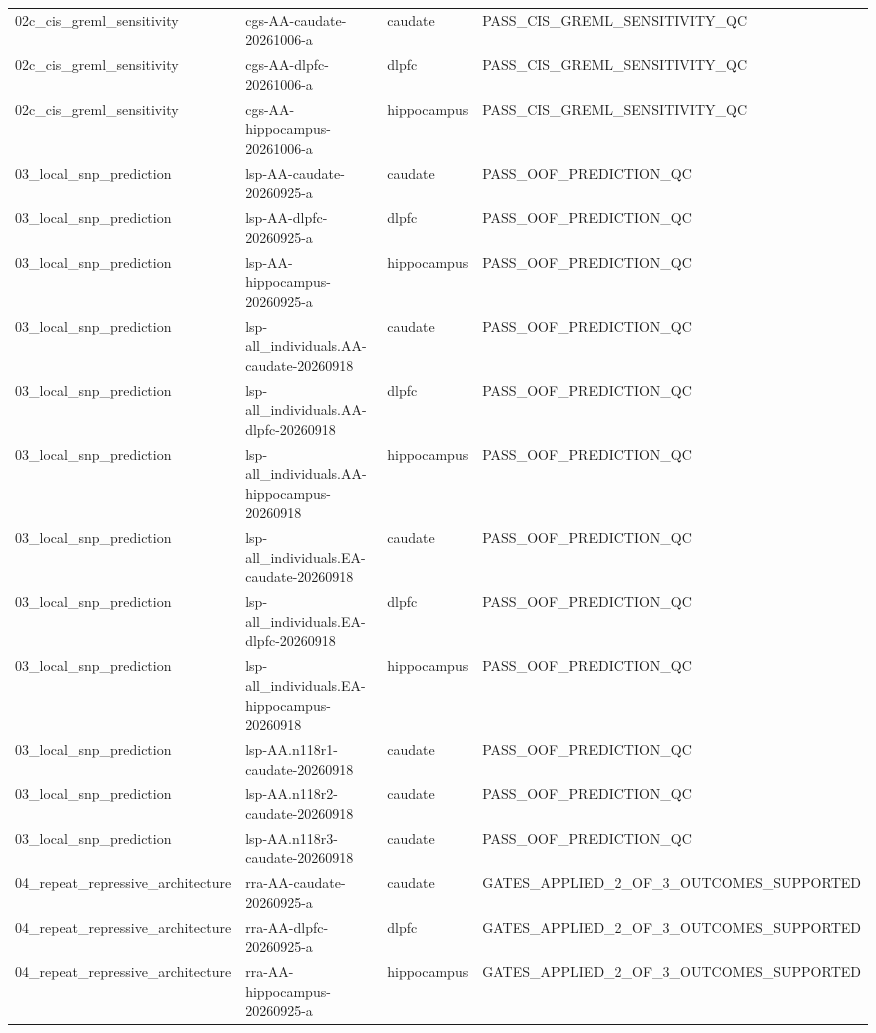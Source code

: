 \begin{tabular}{llll}
02c\_cis\_greml\_sensitivity & cgs-AA-caudate-20261006-a & caudate & PASS\_CIS\_GREML\_SENSITIVITY\_QC \\
02c\_cis\_greml\_sensitivity & cgs-AA-dlpfc-20261006-a & dlpfc & PASS\_CIS\_GREML\_SENSITIVITY\_QC \\
02c\_cis\_greml\_sensitivity & cgs-AA-hippocampus-20261006-a & hippocampus & PASS\_CIS\_GREML\_SENSITIVITY\_QC \\
03\_local\_snp\_prediction & lsp-AA-caudate-20260925-a & caudate & PASS\_OOF\_PREDICTION\_QC \\
03\_local\_snp\_prediction & lsp-AA-dlpfc-20260925-a & dlpfc & PASS\_OOF\_PREDICTION\_QC \\
03\_local\_snp\_prediction & lsp-AA-hippocampus-20260925-a & hippocampus & PASS\_OOF\_PREDICTION\_QC \\
03\_local\_snp\_prediction & lsp-all\_individuals.AA-caudate-20260918 & caudate & PASS\_OOF\_PREDICTION\_QC \\
03\_local\_snp\_prediction & lsp-all\_individuals.AA-dlpfc-20260918 & dlpfc & PASS\_OOF\_PREDICTION\_QC \\
03\_local\_snp\_prediction & lsp-all\_individuals.AA-hippocampus-20260918 & hippocampus & PASS\_OOF\_PREDICTION\_QC \\
03\_local\_snp\_prediction & lsp-all\_individuals.EA-caudate-20260918 & caudate & PASS\_OOF\_PREDICTION\_QC \\
03\_local\_snp\_prediction & lsp-all\_individuals.EA-dlpfc-20260918 & dlpfc & PASS\_OOF\_PREDICTION\_QC \\
03\_local\_snp\_prediction & lsp-all\_individuals.EA-hippocampus-20260918 & hippocampus & PASS\_OOF\_PREDICTION\_QC \\
03\_local\_snp\_prediction & lsp-AA.n118r1-caudate-20260918 & caudate & PASS\_OOF\_PREDICTION\_QC \\
03\_local\_snp\_prediction & lsp-AA.n118r2-caudate-20260918 & caudate & PASS\_OOF\_PREDICTION\_QC \\
03\_local\_snp\_prediction & lsp-AA.n118r3-caudate-20260918 & caudate & PASS\_OOF\_PREDICTION\_QC \\
04\_repeat\_repressive\_architecture & rra-AA-caudate-20260925-a & caudate & GATES\_APPLIED\_2\_OF\_3\_OUTCOMES\_SUPPORTED \\
04\_repeat\_repressive\_architecture & rra-AA-dlpfc-20260925-a & dlpfc & GATES\_APPLIED\_2\_OF\_3\_OUTCOMES\_SUPPORTED \\
04\_repeat\_repressive\_architecture & rra-AA-hippocampus-20260925-a & hippocampus & GATES\_APPLIED\_2\_OF\_3\_OUTCOMES\_SUPPORTED \\

\end{tabular}

